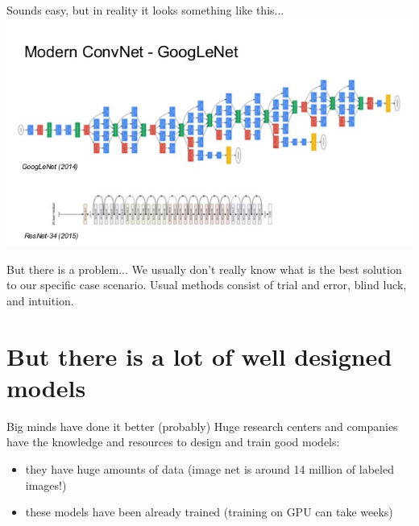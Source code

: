\documentclass[aspectratio=1610,english]{beamer} %
\begin{document}
 	\begin{frame}{Sounds easy, but in reality it looks something like this...}
 	\centering
	 \includegraphics[scale=0.6]{images/design}
	\end{frame}
 
	\begin{frame}{But there is a problem...}
		We usually don't really know what is the best solution to our specific case scenario.
		\newline
		\newline
		Usual methods consist of trial and error, blind luck, and intuition.
	
	 \end{frame}
 
 	\section{But there is a lot of well designed models}
	\begin{frame}{Big minds have done it better (probably)}
	Huge research centers and companies have the knowledge and resources to design and train good models:
		 \begin{itemize}
		 	\item they have huge amounts of data (image net is around 14 million of labeled images!)
		 	\item these models have been already trained (training on GPU can take weeks)
		 \end{itemize}
	\end{frame}
\end{document}
